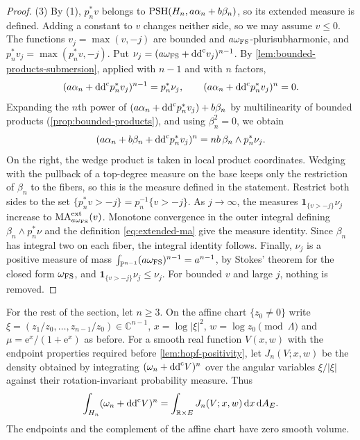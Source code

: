 \begin{proof}
(3) By (1), $p_n^*v$ belongs to $\mathrm{PSH}(H_n,a\alpha_n+b\beta_n)$, so its extended measure is defined. Adding a constant to $v$ changes neither side, so we may assume $v\leq0$. The functions $v_j=\max(v,-j)$ are bounded and $a\omega_{\mathrm{FS}}$-plurisubharmonic, and $p_n^*v_j=\max(p_n^*v,-j)$. Put $\nu_j=(a\omega_{\mathrm{FS}}+\mathrm{dd}^{\mathrm{c}} v_j)^{n-1}$. By \cref{lem:bounded-products-submersion}, applied with $n-1$ and with $n$ factors,
\[
 (a\alpha_n+\mathrm{dd}^{\mathrm{c}} p_n^*v_j)^{n-1}=p_n^*\nu_j,
 \qquad
 (a\alpha_n+\mathrm{dd}^{\mathrm{c}} p_n^*v_j)^n=0.
\]
Expanding the $n$th power of $(a\alpha_n+\mathrm{dd}^{\mathrm{c}} p_n^*v_j)+b\beta_n$ by multilinearity of bounded products (\cref{prop:bounded-products}), and using $\beta_n^2=0$, we obtain
\[
 (a\alpha_n+b\beta_n+\mathrm{dd}^{\mathrm{c}} p_n^*v_j)^n
 =nb\,\beta_n\wedge p_n^*\nu_j.
\]
On the right, the wedge product is taken in local product coordinates. Wedging with the pullback of a top-degree measure on the base keeps only the restriction of $\beta_n$ to the fibers, so this is the measure defined in the statement. Restrict both sides to the set $\{p_n^*v>-j\}=p_n^{-1}\{v>-j\}$. As $j\to\infty$, the measures $\mathbf 1_{\{v>-j\}}\nu_j$ increase to $\mathrm{MA}^{\mathrm{ext}}_{a\omega_{\mathrm{FS}}}(v)$. Monotone convergence in the outer integral defining $\beta_n\wedge p_n^*\nu$ and the definition \eqref{eq:extended-ma} give the measure identity. Since $\beta_n$ has integral two on each fiber, the integral identity follows. Finally, $\nu_j$ is a positive measure of mass $\int_{\mathbb P^{n-1}}(a\omega_{\mathrm{FS}})^{n-1}=a^{n-1}$, by Stokes' theorem for the closed form $\omega_{\mathrm{FS}}$, and $\mathbf 1_{\{v>-j\}}\nu_j\leq\nu_j$. For bounded $v$ and large $j$, nothing is removed.
\end{proof}

For the rest of the section, let $n\geq3$. On the affine chart $\{z_0\neq0\}$ write $\xi=(z_1/z_0,\dots,z_{n-1}/z_0)\in\mathbb C^{n-1}$,
$x=\log|\xi|^2$, $w=\log z_0\pmod\Lambda$ and
$\mu=\mathrm e^x/(1+\mathrm e^x)$ as before. For a smooth real function $V(x,w)$ with the endpoint properties required before \cref{lem:hopf-positivity}, let $J_n(V;x,w)$ be the density obtained by integrating $(\omega_n+\mathrm{dd}^{\mathrm{c}} V)^n$ over the angular variables $\xi/|\xi|$ against their rotation-invariant probability measure. Thus
\[
 \int_{H_n}(\omega_n+\mathrm{dd}^{\mathrm{c}} V)^n
   =\int_{\mathbb R\times E}J_n(V;x,w)\,\mathrm dx\,\mathrm dA_E.
\]
The endpoints and the complement of the affine chart have zero smooth volume.

